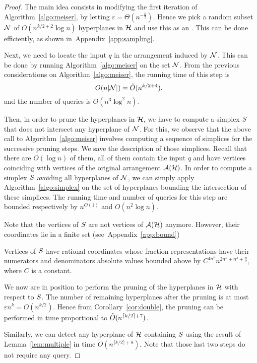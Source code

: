 \begin{proof}
The main idea consists in modifying the first iteration of Algorithm~\ref{algo:meiser}, by
letting $\varepsilon = \Theta(n^{-\frac{k}{2}})$.
Hence we pick a random subset $\mathcal{N}$ of
$O(n^{k/2 + 2} \log n)$ hyperplanes in $\mathcal{H}$ and use this as an \enet.
This can be done efficiently, as shown in~Appendix~\ref{app:sampling}.

Next, we need to locate the input $q$ in the arrangement induced by
$\mathcal{N}$. This can be done by running Algorithm~\ref{algo:meiser} on the set
$\mathcal{N}$. From the previous considerations on Algorithm~\ref{algo:meiser}, the
running time of this step is
$$
O(n|\mathcal{N}|) = \tilde{O}(n^{k/2 + 4}),
$$
and the number of queries is $O(n^3\log^2 n)$.

Then, in order to prune the hyperplanes in $\mathcal{H}$, we have to
compute a simplex $S$ that does not intersect any hyperplane of
$\mathcal{N}$. For this, we observe that the above call to Algorithm~\ref{algo:meiser}
involves computing a sequence of simplices for the successive pruning
steps. We save the description of those simplices. Recall that there are
$O(\log n)$ of them, all of them contain the input $q$ and have vertices
coinciding with vertices of the original arrangement $\mathcal{A}(\mathcal{H})$. In
order to compute a simplex $S$ avoiding all hyperplanes of
$\mathcal{N}$, we can simply apply Algorithm~\ref{algo:simplex} on the set of
hyperplanes bounding the intersection of these simplices. The running time
and number of queries for this step are bounded respectively by
$n^{O(1)}$ and $O(n^2\log n)$.

Note that the vertices of $S$ are not vertices
of $\mathcal{A}(\mathcal{H})$ anymore. However, their coordinates lie in a finite set
(see~Appendix~\ref{app:bound})
\begin{lemma}\label{lem:bound}
Vertices of $S$ have rational coordinates whose fraction representations
have their numerators and denominators absolute values bounded above by
$C^{4n^5} n^{2n^5+n^3+\frac n2}$, where $C$ is a constant.
\end{lemma}

We now are in position to perform the pruning of the hyperplanes in $\mathcal{H}$ with
respect to $S$. The number of remaining hyperplanes after the pruning is
at most $\varepsilon n^k = O(n^{k/2})$. Hence from Corollary~\ref{cor:double}, the
pruning can be performed in time proportional to $\tilde{O}(n^{\lceil k/2\rceil + 7})$.

Similarly, we can detect any hyperplane of $\mathcal{H}$ containing $S$ using the
result of Lemma~\ref{lem:multiple} in time $\tilde{O}(n^{\lceil k/2\rceil +
8})$. Note that those last two steps do not require any query.


\end{proof}
